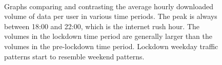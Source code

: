 \begin{figure}[t]
{    }
    \\
    \hspace{0.2cm}
        
    \caption{Graphs comparing and contrasting the average hourly downloaded volume of data per user in various time periods. The peak is always between 18:00 and 22:00, which is the internet rush hour. The volumes in the lockdown time period are generally larger than the volumes in the pre-lockdown time period. Lockdown weekday traffic patterns start to resemble weekend patterns.
    }
    \label{fig:download-data-per-user-hours-fig}
\end{figure}

